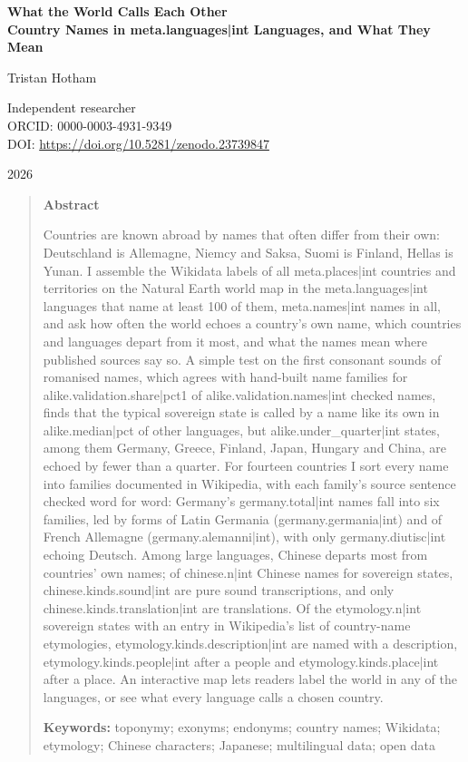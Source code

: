 \documentclass[11pt,a4paper]{article}
\begin{document}
\begin{center}
{\Large\bfseries What the World Calls Each Other\\[2pt] Country Names in {{meta.languages|int}} Languages, and What They Mean\par}
\vspace{1.2em}
{\large Tristan Hotham\par}
\vspace{0.3em}
{\small Independent researcher\\
ORCID: 0000-0003-4931-9349\\
DOI: \href{https://doi.org/10.5281/zenodo.23739847}{https://doi.org/10.5281/zenodo.23739847}\par}
\vspace{0.8em}
2026
\end{center}

\begin{quote}
\small
\begin{center}\textbf{Abstract}\end{center}
Countries are known abroad by names that often differ from their own: Deutschland is Allemagne, Niemcy and Saksa, Suomi is Finland, Hellas is Yunan. I assemble the Wikidata labels of all {{meta.places|int}} countries and territories on the Natural Earth world map in the {{meta.languages|int}} languages that name at least 100 of them, {{meta.names|int}} names in all, and ask how often the world echoes a country's own name, which countries and languages depart from it most, and what the names mean where published sources say so. A simple test on the first consonant sounds of romanised names, which agrees with hand-built name families for {{alike.validation.share|pct1}} of {{alike.validation.names|int}} checked names, finds that the typical sovereign state is called by a name like its own in {{alike.median|pct}} of other languages, but {{alike.under_quarter|int}} states, among them Germany, Greece, Finland, Japan, Hungary and China, are echoed by fewer than a quarter. For fourteen countries I sort every name into families documented in Wikipedia, with each family's source sentence checked word for word: Germany's {{germany.total|int}} names fall into six families, led by forms of Latin Germania ({{germany.germania|int}}) and of French Allemagne ({{germany.alemanni|int}}), with only {{germany.diutisc|int}} echoing Deutsch. Among large languages, Chinese departs most from countries' own names; of {{chinese.n|int}} Chinese names for sovereign states, {{chinese.kinds.sound|int}} are pure sound transcriptions, and only {{chinese.kinds.translation|int}} are translations. Of the {{etymology.n|int}} sovereign states with an entry in Wikipedia's list of country-name etymologies, {{etymology.kinds.description|int}} are named with a description, {{etymology.kinds.people|int}} after a people and {{etymology.kinds.place|int}} after a place. An interactive map lets readers label the world in any of the languages, or see what every language calls a chosen country.

\textbf{Keywords:} toponymy; exonyms; endonyms; country names; Wikidata; etymology; Chinese characters; Japanese; multilingual data; open data
\end{quote}
\end{document}
